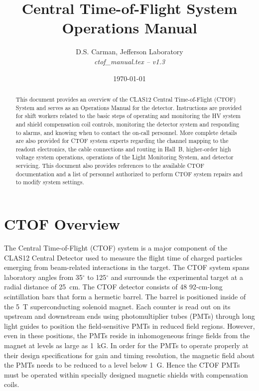 \documentclass[12pt]{article}
\begin{document}
\title{Central Time-of-Flight System Operations Manual}

\vskip 0.5cm

\author{D.S. Carman, Jefferson Laboratory\\[0.2ex]
{\it ctof\_manual.tex -- v1.3}}

\date \today
%
\maketitle

\begin{abstract}
This document provides an overview of the CLAS12 Central Time-of-Flight (CTOF) 
System and serves as an Operations Manual for the detector. Instructions are 
provided for shift workers related to the basic steps of operating and monitoring 
the HV system and shield compensation coil controls, monitoring the detector 
system and responding to alarms, and knowing when to contact the on-call personnel. 
More complete details are also provided for CTOF system experts regarding the 
channel mapping to the readout electronics, the cable connections and routing in 
Hall~B, higher-order high voltage system operations, operations of the Light 
Monitoring System, and detector servicing. This document also provides references 
to the available CTOF documentation and a list of personnel authorized to perform 
CTOF system repairs and to modify system settings.
\end{abstract}

\thispagestyle{empty}

\clearpage

\vfil
\eject

\tableofcontents

\vfil
\eject

\section{CTOF Overview}
\label{intro}

The Central Time-of-Flight (CTOF) system is a major component of the CLAS12 
Central Detector used to measure the flight time of charged particles emerging 
from beam-related interactions in the target. The CTOF system spans laboratory 
angles from 35$^\circ$ to 125$^\circ$ and surrounds the experimental target at a 
radial distance of 25~cm. The CTOF detector consists of 48 92-cm-long scintillation 
bars that form a hermetic barrel. The barrel is positioned inside of the 5~T 
superconducting solenoid magnet. Each counter is read out on its upstream and
downstream ends using photomultiplier tubes (PMTs) through long light guides to 
position the field-sensitive PMTs in reduced field regions. However, even in these 
positions, the PMTs reside in inhomogeneous fringe fields from the magnet at levels 
as large as 1~kG. In order for the PMTs to operate properly at their design 
specifications for gain and timing resolution, the magnetic field about the PMTs 
needs to be reduced to a level below 1~G. Hence the CTOF PMTs must be operated 
within specially designed magnetic shields with compensation coils.
\end{document}
